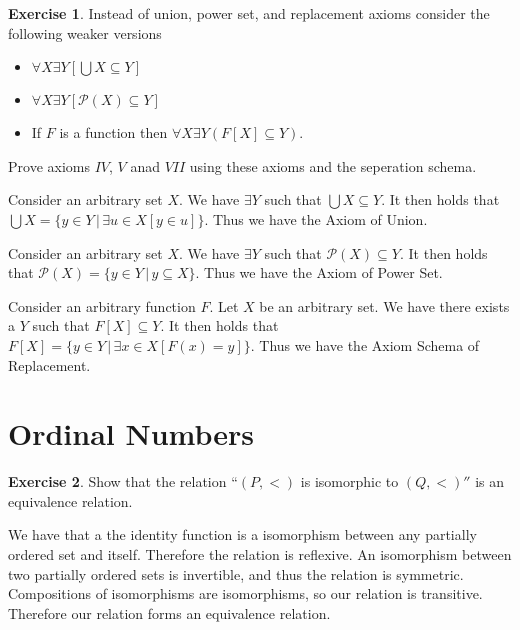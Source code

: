 \documentclass{article}
\theoremstyle{definition}
\newtheorem{exer}{Exercise}[section]
\newcommand{\powset}[1]{\mathcal{P}(#1)}
\newlength{\defparindent}
\newenvironment{answer}
    {\begin{mdframed}[backgroundcolor=gray!15, linewidth=0pt] \setlength{\parindent}{\defparindent}}
    {\end{mdframed}}
\begin{document}
\begin{exer}
    Instead of union, power set, and replacement axioms consider the following weaker versions 
    \begin{itemize}
        \item $\forall X \exists Y [\bigcup X \subseteq Y]$
        \item $\forall X \exists Y [\powset{X} \subseteq Y]$
        \item If $F$ is a function then  $\forall X \exists Y(F[X] \subseteq Y)$.
    \end{itemize}
    Prove axioms $IV$, $V$ anad $VII$ using these axioms and the seperation schema.
    \begin{answer}
        Consider an arbitrary set $X$. We have $\exists Y$ such that $\bigcup X \subseteq Y$. It then holds that $\bigcup X = \{y \in Y \, | \, \exists u \in X [y \in u] \}$. Thus we have the Axiom of Union.
        
        Consider an arbitrary set $X$. We have $\exists Y$ such that $\powset{X} \subseteq Y$. It then holds that $\powset{X} = \{y \in Y \, | \, y \subseteq X\}$. Thus we have the Axiom of Power Set.
        
        Consider an arbitrary function $F$. Let $X$ be an arbitrary set. We have there exists a $Y$ such that $F[X] \subseteq Y$. It then holds that $F[X] = \{y \in Y \, | \, \exists x \in X [F(x) = y] \}$. Thus we have the Axiom Schema of Replacement.
    \end{answer}
\end{exer}

\section{Ordinal Numbers}

\begin{exer}
    Show that the relation ``$(P, <)$ is isomorphic to $(Q, <)''$ is an equivalence relation. 
    \begin{answer}
        We have that a the identity function is a isomorphism between any partially ordered set and itself. Therefore the relation is reflexive. An isomorphism between two partially ordered sets is invertible, and thus the relation is symmetric. Compositions of isomorphisms are isomorphisms, so our relation is transitive. Therefore our relation forms an equivalence relation.
    \end{answer}
\end{exer}
\end{document}
